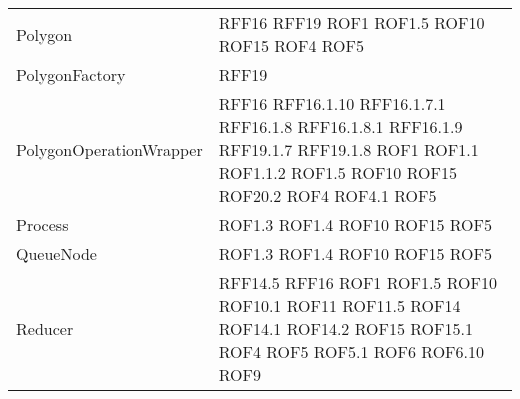 \begin{longtable}{p{5cm}!{\VRule[1pt]}p{2.5cm}}
	Polygon & RFF16 \newline RFF19 \newline ROF1 \newline ROF1.5 \newline ROF10 \newline ROF15 \newline ROF4 \newline ROF5\\
	PolygonFactory & RFF19\\
	PolygonOperationWrapper & RFF16 \newline RFF16.1.10 \newline RFF16.1.7.1 \newline RFF16.1.8 \newline RFF16.1.8.1 \newline RFF16.1.9 \newline RFF19.1.7 \newline RFF19.1.8 \newline ROF1 \newline ROF1.1 \newline ROF1.1.2 \newline ROF1.5 \newline ROF10 \newline ROF15 \newline ROF20.2 \newline ROF4 \newline ROF4.1 \newline ROF5\\
	Process & ROF1.3 \newline ROF1.4 \newline ROF10 \newline ROF15 \newline ROF5\\
	QueueNode & ROF1.3 \newline ROF1.4 \newline ROF10 \newline ROF15 \newline ROF5\\
	Reducer & RFF14.5 \newline RFF16 \newline ROF1 \newline ROF1.5 \newline ROF10 \newline ROF10.1 \newline ROF11 \newline ROF11.5 \newline ROF14 \newline ROF14.1 \newline ROF14.2 \newline ROF15 \newline ROF15.1 \newline ROF4 \newline ROF5 \newline ROF5.1 \newline ROF6 \newline ROF6.10 \newline ROF9\\

\end{longtable}
